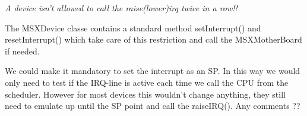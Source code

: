 \documentclass[11pt, a4paper]{report}
\begin{document}
\emph{A device isn't allowed to call the raise(lower)irq twice in a row!!}

The MSXDevice classe contains a standard method setInterrupt() and
resetInterrupt() which take care of this restriction and call the
MSXMotherBoard if needed.

We could make it mandatory to set the interrupt as an SP. In this way we
would only need to test if the IRQ-line is active each time we call the
CPU from the scheduler. However for most devices this wouldn't change
anything, they still need to emulate up until the SP point and call the
raiseIRQ(). Any comments ??
\end{document}
